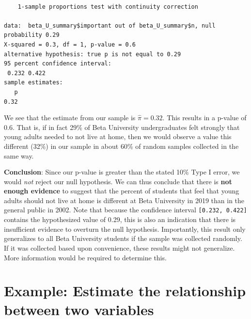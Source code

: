 \documentclass[
  letterpaper,
  DIV=11,
  numbers=noendperiod]{scrreprt}
\newenvironment{Shaded}{\begin{snugshade}}{\end{snugshade}}
\newcommand{\AttributeTok}[1]{\textcolor[rgb]{0.40,0.45,0.13}{#1}}
\newcommand{\FloatTok}[1]{\textcolor[rgb]{0.68,0.00,0.00}{#1}}
\newcommand{\FunctionTok}[1]{\textcolor[rgb]{0.28,0.35,0.67}{#1}}
\newcommand{\NormalTok}[1]{\textcolor[rgb]{0.00,0.23,0.31}{#1}}
\newcommand{\SpecialCharTok}[1]{\textcolor[rgb]{0.37,0.37,0.37}{#1}}
\theoremstyle{definition}
\theoremstyle{remark}
\begin{document}
\begin{Shaded}
\end{Shaded}

\begin{verbatim}

    1-sample proportions test with continuity correction

data:  beta_U_summary$important out of beta_U_summary$n, null probability 0.29
X-squared = 0.3, df = 1, p-value = 0.6
alternative hypothesis: true p is not equal to 0.29
95 percent confidence interval:
 0.232 0.422
sample estimates:
   p 
0.32 
\end{verbatim}

We see that the estimate from our sample is \(\hat{\pi} = 0.32\). This
results in a p-value of \(0.6\). That is, if in fact 29\% of Beta
University undergraduates felt strongly that young adults needed to not
live at home, then we would observe a value this different (32\%) in our
sample in about 60\% of random samples collected in the same way.

\textbf{Conclusion}: Since our p-value is greater than the stated 10\%
Type I error, we would \emph{not} reject our null hypothesis. We can
thus conclude that there is \textbf{not enough evidence} to suggest that
the percent of students that feel that young adults should not live at
home is different at Beta University in 2019 than in the general public
in 2002. Note that because the confidence interval
\texttt{{[}0.232,\ 0.422{]}} contains the hypothesized value of 0.29,
this is also an indication that there is insufficient evidence to
overturn the null hypothesis. Importantly, this result only generalizes
to all Beta University students if the sample was collected randomly. If
it was collected based upon convenience, these results might not
generalize. More information would be required to determine this.

\hypertarget{example-estimate-the-relationship-between-two-variables}{%
\section{Example: Estimate the relationship between two
variables}\label{example-estimate-the-relationship-between-two-variables}}
\end{document}
